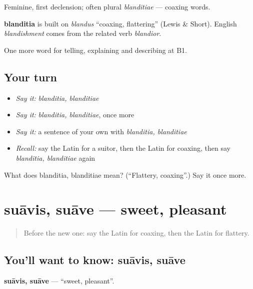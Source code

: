 Feminine, first declension; often plural \emph{blanditiae} — coaxing words.

\begin{cousinweb}
\textbf{blanditia} is built on \emph{blandus} \textquotedblleft{}coaxing, flattering\textquotedblright{} (Lewis \& Short). English \emph{blandishment} comes from the related verb \emph{blandior}.
\end{cousinweb}

\begin{grammarlens}[title={What you've built}]
One more word for telling, explaining and describing at B1.
\end{grammarlens}

\subsection*{Your turn}
\begin{itemize}
\raggedright
  \item \emph{Say it:} \emph{blanditia, blanditiae}
  \item \emph{Say it:} \emph{blanditia, blanditiae}, once more
  \item \emph{Say it:} a sentence of your own with \emph{blanditia, blanditiae}
  \item \emph{Recall:} say the Latin for a suitor, then the Latin for coaxing, then say \emph{blanditia, blanditiae} again
\end{itemize}

\begin{tcolorbox}[breakable,colback=teal!4,colframe=teal!35!black,title={Before you move on}]
What does blanditia, blanditiae mean? (\textquotedblleft{}Flattery, coaxing\textquotedblright{}.) Say it once more.
\end{tcolorbox}
\section[suāvis, suāve]{suāvis, suāve — sweet, pleasant}

\label{lesson:LA-C536-suavis}



\begin{quote}
Before the new one: say the Latin for coaxing, then the Latin for flattery.
\end{quote}

\subsection*{You'll want to know: suāvis, suāve}
\textbf{suāvis, suāve} — \textquotedblleft{}sweet, pleasant\textquotedblright{}.

